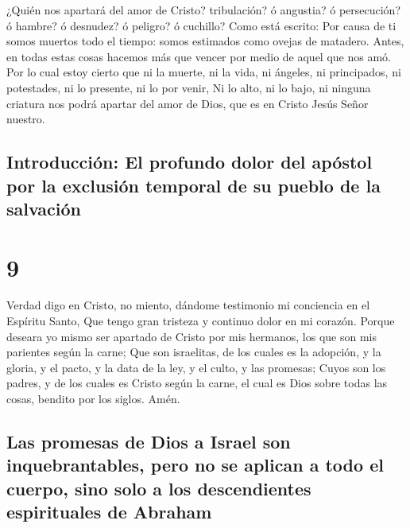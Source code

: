  ¿Quién nos apartará del amor de Cristo? tribulación? ó
angustia? ó persecución? ó hambre? ó desnudez? ó peligro? ó cuchillo?
 Como está escrito: Por causa de ti somos muertos todo el
tiempo: somos estimados como ovejas de matadero.  Antes,
en todas estas cosas hacemos más que vencer por medio de aquel que nos
amó.  Por lo cual estoy cierto que ni la muerte, ni la
vida, ni ángeles, ni principados, ni potestades, ni lo presente, ni lo
por venir,  Ni lo alto, ni lo bajo, ni ninguna criatura
nos podrá apartar del amor de Dios, que es en Cristo Jesús Señor
nuestro.

\hypertarget{introducciuxf3n-el-profundo-dolor-del-apuxf3stol-por-la-exclusiuxf3n-temporal-de-su-pueblo-de-la-salvaciuxf3n}{%
\subsection{Introducción: El profundo dolor del apóstol por la exclusión
temporal de su pueblo de la
salvación}\label{introducciuxf3n-el-profundo-dolor-del-apuxf3stol-por-la-exclusiuxf3n-temporal-de-su-pueblo-de-la-salvaciuxf3n}}

\hypertarget{section-8}{%
\section{9}\label{section-8}}

 Verdad digo en Cristo, no miento, dándome testimonio mi
conciencia en el Espíritu Santo,  Que tengo gran tristeza
y continuo dolor en mi corazón.  Porque deseara yo mismo
ser apartado de Cristo por mis hermanos, los que son mis parientes según
la carne;  Que son israelitas, de los cuales es la
adopción, y la gloria, y el pacto, y la data de la ley, y el culto, y
las promesas;  Cuyos son los padres, y de los cuales es
Cristo según la carne, el cual es Dios sobre todas las cosas, bendito
por los siglos. Amén.

\hypertarget{las-promesas-de-dios-a-israel-son-inquebrantables-pero-no-se-aplican-a-todo-el-cuerpo-sino-solo-a-los-descendientes-espirituales-de-abraham}{%
\subsection{Las promesas de Dios a Israel son inquebrantables, pero no
se aplican a todo el cuerpo, sino solo a los descendientes espirituales
de
Abraham}\label{las-promesas-de-dios-a-israel-son-inquebrantables-pero-no-se-aplican-a-todo-el-cuerpo-sino-solo-a-los-descendientes-espirituales-de-abraham}}

